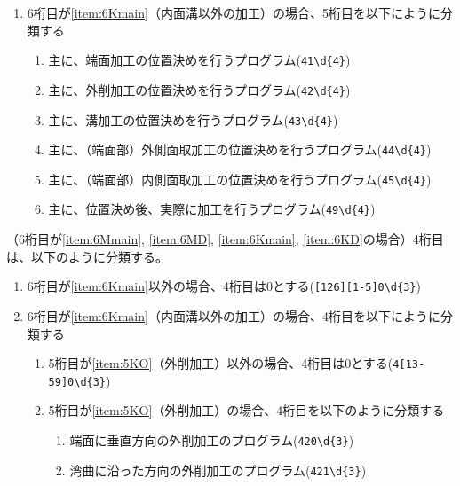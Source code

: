 \begin{enumerate}[label=\alph*)]
\item 6桁目が\ref{item:6Kmain}（内面溝以外の加工）の場合、5桁目を以下にように分類する
  \begin{enumerate}[label=\arabic*., ref=\arabic*, start=1]
  \item\label{item:5KF} 主に、端面加工の位置決めを行うプログラム(\verb|41\d{4}|)
  \item\label{item:5KO} 主に、外削加工の位置決めを行うプログラム(\verb|42\d{4}|)
  \item\label{item:5KK} 主に、溝加工の位置決めを行うプログラム(\verb|43\d{4}|)
  \item\label{item:5KCO} 主に、（端面部）外側面取加工の位置決めを行うプログラム(\verb|44\d{4}|)
  \item\label{item:5KCI} 主に、（端面部）内側面取加工の位置決めを行うプログラム(\verb|45\d{4}|)
\setcounter{enumii}{8}
  \item 主に、位置決め後、実際に加工を行うプログラム(\verb|49\d{4}|)
  \end{enumerate}
\end{enumerate}


（6桁目が\ref{item:6Mmain}, \ref{item:6MD}, \ref{item:6Kmain}, \ref{item:6KD}の場合）4桁目は、以下のように分類する。
\begin{enumerate}[label=\alph*), ref=\alph*)]
\item 6桁目が\ref{item:6Kmain}\hx 以外の場合、4桁目は0とする(\verb|[126][1-5]0\d{3}|)
\item 6桁目が\ref{item:6Kmain}（内面溝以外の加工）の場合、4桁目を以下にように分類する
  \begin{enumerate}[label=\alph{enumi}\,-\arabic*), leftmargin=\leftmargini]
  \item 5桁目が\ref{item:5KO}（外削加工）以外の場合、4桁目は0とする(\verb|4[13-59]0\d{3}|)
  \item 5桁目が\ref{item:5KO}（外削加工）の場合、4桁目を以下のように分類する
    \begin{enumerate}[label=\arabic*., ref=\arabic*, start=0, leftmargin=*]
    \item 端面に垂直方向の外削加工のプログラム(\verb|420\d{3}|)
    \item 湾曲に沿った方向の外削加工のプログラム(\verb|421\d{3}|)
    \end{enumerate}
  \end{enumerate}
\end{enumerate}



